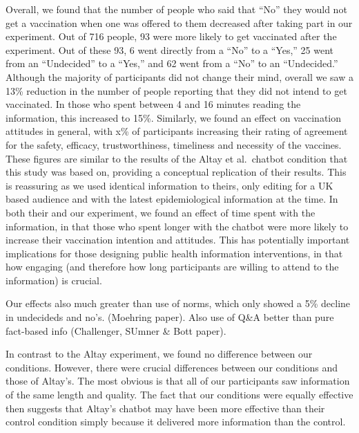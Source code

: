 \documentclass[
  english,
  ,jou,floatsintext]{apa6}
\begin{document}
Overall, we found that the number of people who said that ``No'' they would not get a vaccination when one was offered to them decreased after taking part in our experiment. Out of 716 people, 93 were more likely to get vaccinated after the experiment. Out of these 93, 6 went directly from a ``No'' to a ``Yes,'' 25 went from an ``Undecided'' to a ``Yes,'' and 62 went from a ``No'' to an ``Undecided.'' Although the majority of participants did not change their mind, overall we saw a 13\% reduction in the number of people reporting that they did not intend to get vaccinated. In those who spent between 4 and 16 minutes reading the information, this increased to 15\%. Similarly, we found an effect on vaccination attitudes in general, with x\% of participants increasing their rating of agreement for the safety, efficacy, trustworthiness, timeliness and necessity of the vaccines. These figures are similar to the results of the Altay et al.~chatbot condition that this study was based on, providing a conceptual replication of their results. This is reassuring as we used identical information to theirs, only editing for a UK based audience and with the latest epidemiological information at the time. In both their and our experiment, we found an effect of time spent with the information, in that those who spent longer with the chatbot were more likely to increase their vaccination intention and attitudes. This has potentially important implications for those designing public health information interventions, in that how engaging (and therefore how long participants are willing to attend to the information) is crucial.

Our effects also much greater than use of norms, which only showed a 5\% decline in undecideds and no's. (Moehring paper). Also use of Q\&A better than pure fact-based info (Challenger, SUmner \& Bott paper).

In contrast to the Altay experiment, we found no difference between our conditions. However, there were crucial differences between our conditions and those of Altay's. The most obvious is that all of our participants saw information of the same length and quality. The fact that our conditions were equally effective then suggests that Altay's chatbot may have been more effective than their control condition simply because it delivered more information than the control.
\end{document}
